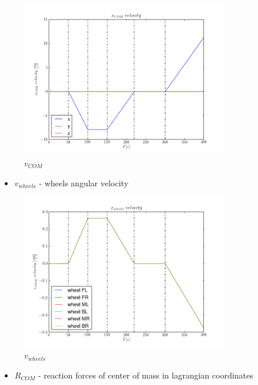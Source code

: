 \begin{figure}[H]
  \centering
    \includegraphics[width=0.8\textwidth]{vCOM3}
  \caption{$v_{COM}$}
\end{figure}

\begin{itemize}
  \item $v_{wheels}$ - wheels angular velocity
\end{itemize}

\begin{figure}[H]
  \centering
    \includegraphics[width=0.8\textwidth]{vWHEELS3}
  \caption{$v_{wheels}$}
\end{figure}

\begin{itemize}
  \item $R_{COM}$ - reaction forces of center of mass in lagrangian coordinates
\end{itemize}

